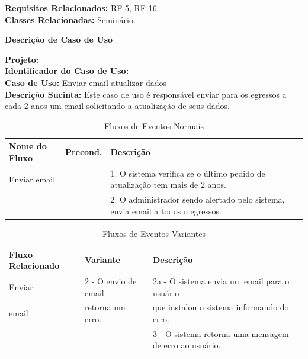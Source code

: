 	

\noindent  \textbf{Requisitos Relacionados:} RF-5, RF-16     \\ \textbf{Classes Relacionadas:} Seminário. 





\newpage
\begin{flushright}    \textbf{Descrição de Caso de Uso}   \end{flushright} 
\noindent \textbf{Projeto:} \imprimirtitulo \\
\textbf{Identificador do Caso de Uso:} \UC\label{uc-email-atualizar-dados}\\ 
\textbf{Caso de Uso:} Enviar email atualizar dados \\
\noindent \textbf{Descrição Sucinta:} Este caso de uso é responsável enviar para os egressos a cada 2 anos um email solicitando a atualização de seus dados.\\

\begin{table}[h]
	\centering 	\vspace{0.5cm} 	\footnotesize
	\caption{Fluxos de Eventos Normais}
	\begin{tabular}{|p{2.3cm}|p{1.1cm}|p{11.4cm}|} \hline  \rowcolor[rgb]{0.8,0.8,0.8}
 					
 		Nome do Fluxo & Precond. & Descrição  \\ \hline		
	
		Enviar email & {} & 1. O sistema verifica se o último pedido de atualização tem mais de 2 anos. \\ 
		
		{} & {} & 2. O administrador sendo alertado pelo sistema, envia email a todos o egressos. \\ \hline
		
		
				
	\end{tabular}	
\end{table}


	\begin{table}[h]
		\centering 	\vspace{0.5cm}    \footnotesize
		\caption{Fluxos de Eventos Variantes}
		\begin{tabular}{|p{3.8cm}|p{4cm}|p{7.0cm}|}    \hline  \rowcolor[rgb]{0.8,0.8,0.8}
 		
 			Fluxo Relacionado &  Variante  &  Descrição    \\	\hline		
		
			Enviar  		& 2 - O envio de email      & 2a - O sistema envia um email para o usuário   \\ 
			email		& retorna um erro.			&  que instalou o sistema informando do erro. \\
			{}    		&{}              			& 3 - O sistema retorna uma mensagem de erro ao usuário. \\\hline
		
		\end{tabular}
	\end{table}	

